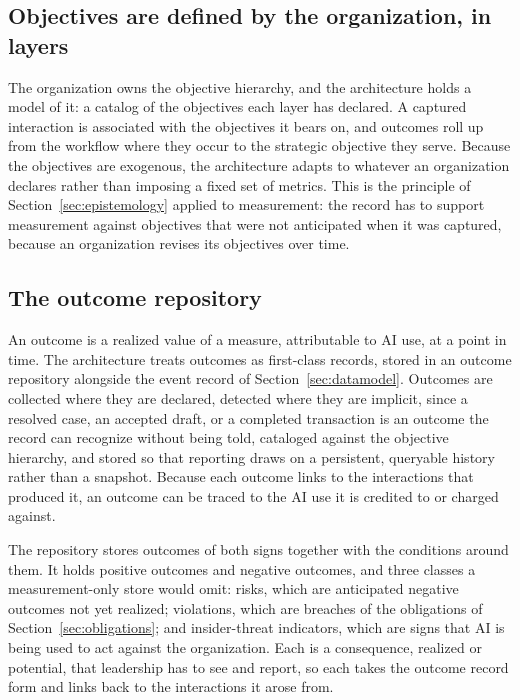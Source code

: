 \documentclass[11pt]{article}
\begin{document}
\subsection{Objectives are defined by the organization, in layers}

The organization owns the objective hierarchy, and the architecture holds a model
of it: a catalog of the objectives each layer has declared. A captured
interaction is associated with the objectives it bears on, and outcomes roll up
from the workflow where they occur to the strategic objective they serve. Because
the objectives are exogenous, the architecture adapts to whatever an organization
declares rather than imposing a fixed set of metrics. This is the principle of
Section~\ref{sec:epistemology} applied to measurement: the record has to support
measurement against objectives that were not anticipated when it was captured,
because an organization revises its objectives over time.

\subsection{The outcome repository}

An outcome is a realized value of a measure, attributable to AI use, at a point
in time. The architecture treats outcomes as first-class records, stored in an
outcome repository alongside the event record of Section~\ref{sec:datamodel}.
Outcomes are collected where they are declared, detected where they are implicit,
since a resolved case, an accepted draft, or a completed transaction is an
outcome the record can recognize without being told, cataloged against the
objective hierarchy, and stored so that reporting draws on a persistent, queryable
history rather than a snapshot. Because each outcome links to the interactions
that produced it, an outcome can be traced to the AI use it is credited to or
charged against.

The repository stores outcomes of both signs together with the conditions around
them. It holds positive outcomes and negative outcomes, and three classes a
measurement-only store would omit: risks, which are anticipated negative outcomes
not yet realized; violations, which are breaches of the obligations of
Section~\ref{sec:obligations}; and insider-threat indicators, which are signs
that AI is being used to act against the organization. Each is a consequence,
realized or potential, that leadership has to see and report, so each takes the
outcome record form and links back to the interactions it arose from.
\end{document}
